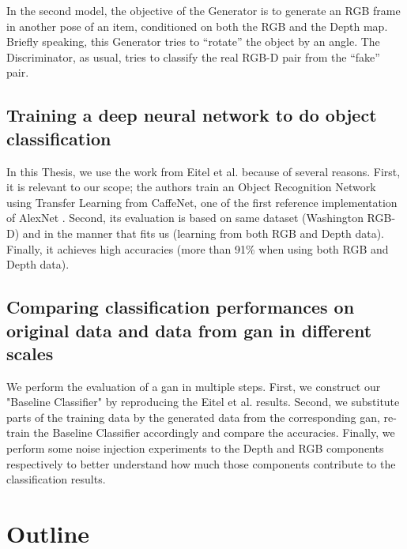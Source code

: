 In the second model, the objective of the Generator is to generate an RGB frame in
another pose of an item, conditioned on both the RGB and the Depth map. Briefly speaking,
this Generator tries to ``rotate'' the object by an angle. The Discriminator, as usual,
tries to classify the real RGB-D pair from the ``fake'' pair.

\subsection{Training a deep neural network to do object classification}
In this Thesis, we use the work from Eitel et al. \cite{eitel} because of several
reasons. First, it is relevant to our scope; the authors train an Object Recognition
Network using Transfer Learning from CaffeNet, one of the first reference implementation
of AlexNet \cite{alexnet}. Second, its
evaluation is based on same dataset (Washington RGB-D) and in the manner that fits us
(learning from both RGB and Depth data). Finally, it achieves high accuracies (more than
91\% when using both RGB and Depth data).

\subsection{Comparing classification performances on original data and data from
	\acrshort{gan} in different scales}

We perform the evaluation of a \acrshort{gan} in multiple steps. First, we construct our
"Baseline Classifier" by reproducing the Eitel et al. \cite{eitel} results. Second, we
substitute parts of the training data by the generated data from the corresponding
\acrshort{gan}, re-train the Baseline Classifier accordingly and compare the accuracies.
Finally, we perform some noise injection experiments to the Depth and RGB components
respectively to better understand how much those components contribute to the
classification results.

\section{Outline\label{sec:outline}}

